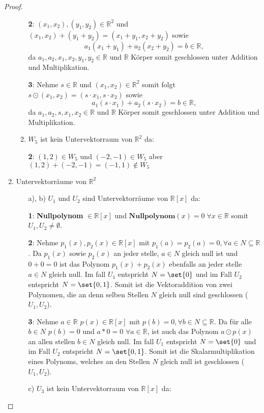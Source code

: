 \documentclass{../problemset}
\begin{document}
\begin{problem}
\begin{proof}
\begin{enumerate}
\begin{enumerate}[label=\alph*)]
			            \textbf{2}: $(x_1, x_2), (y_1, y_2) \in \mathbb{R}^2$ und $(x_1, x_2) + (y_1+y_2) = (x_1 + y_1, x_2 + y_2)$ sowie \[
				            a_1(x_1+y_1) + a_2(x_2+y_2) = b \in \mathbb{R},
			            \] da $a_1,a_2,x_1,x_2,y_1,y_2 \in \mathbb{R}$ und $\mathbb{R}$ Körper somit geschlossen unter Addition und Multiplikation.

			            \textbf{3}: Nehme $s \in \mathbb{R}$ und $(x_1, x_2) \in \mathbb{R}^2$ somit folgt $s \odot (x_1, x_2) = (s \cdot x_1, s \cdot x_2)$ sowie \[
				            a_1(s \cdot x_1) + a_2(s \cdot x_2) = b \in \mathbb{R},
			            \] da $a_1,a_2, s,x_1,x_2 \in \mathbb{R}$ und $\mathbb{R}$ Körper somit geschlossen unter Addition und Multiplikation.
			      \item $W_5$ ist kein Untervektorraum von $\mathbb{R}^2$ da:

			            \textbf{2}: $(1, 2) \in W_5$ und $(-2, -1) \in W_5$ aber $(1, 2) + (-2, -1) = (-1, 1) \not\in W_5$
		      \end{enumerate}
		\item Untervektorräume von $\mathbb{R}^2$

		      \begin{enumerate}
			      \item [a), b)] $U_1$ und $U_2$ sind Untervektorräume von $\mathbb{R}[x]$ da:

			            \textbf{1}: \textbf{Nullpolynom} $\in \mathbb{R}[x]$ und $\textbf{Nullpolynom}(x) = 0 \; \forall x \in \mathbb{R}$ somit $U_1, U_2 \neq \emptyset$. \checkmark

                        \textbf{2}: Nehme $p_1(x), p_2(x) \in \mathbb{R}[x]$ mit $p_1(a) = p_2(a) = 0, \forall a \in N \subseteq \mathbb{R}$.
			            Da $p_1(x)$ sowie $p_2(x)$ an jeder stelle, $a \in N$ gleich null ist und $0 + 0 = 0$ ist das Polynom $p_1(x) + p_2(x)$ ebenfalls an jeder stelle $a \in N$ gleich null.
			            Im fall $U_1$ entspricht $N = \set{0}$ und im Fall $U_2$ entspricht $N = \set{0, 1}$.
			            Somit ist die Vektoraddition von zwei Polynomen, die an denn selben Stellen $N$ gleich null sind geschlossen ($U_1, U_2$). \checkmark

			            \textbf{3}: Nehme $a \in \mathbb{R}$ $p(x) \in \mathbb{R}[x]$ mit $p(b)= 0, \forall b \in N \subseteq \mathbb{R}$.
			            Da für alle $b \in N$ $p(b) = 0$ und $a * 0 = 0$ $\forall a \in \mathbb{R}$, ist auch das Polynom $a \odot p(x)$ an allen stellen $b \in N$ gleich null.
			            Im fall $U_1$ entspricht $N = \set{0}$ und im Fall $U_2$ entspricht $N = \set{0, 1}$.
			            Somit ist die Skalarmultiplikation eines Polynoms, welches an den Stellen $N$ gleich null ist geschlossen ($U_1, U_2$). \checkmark
			      \item [c)] $U_3$ ist kein Untervektorraum von $\mathbb{R}[x]$ da:


\end{enumerate}
\end{enumerate}
\end{proof}
\end{problem}
\end{document}
